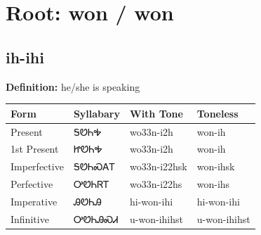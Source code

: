 \documentclass{article}%
\begin{document}
%
\normalsize%
\section*{Root: won / won}%
\subsection*{ih-ihi}%
\textbf{Definition: }%
he/she is speaking%
\\[0.5em]%
\begin{tabular}{|l|l|l|l|}%
\hline%
\textbf{Form}&\textbf{Syllabary}&\textbf{With Tone}&\textbf{Toneless}\\%
\hline%
Present&ᎦᏬᏂᎭ&wo33n{-}i2h&won{-}ih\\%
1st Present&ᏥᏬᏂᎭ&wo33n{-}i2h&won{-}ih\\%
Imperfective&ᎦᏬᏂᏍᎪᎢ&wo33n{-}i22hsk&won{-}ihsk\\%
Perfective&ᎤᏬᏂᏒᎢ&wo33n{-}i22hs&won{-}ihs\\%
Imperative&ᎯᏬᏂᎯ&hi{-}won{-}ihi&hi{-}won{-}ihi\\%
Infinitive&ᎤᏬᏂᎯᏍᏗ&u{-}won{-}ihihst&u{-}won{-}ihihst\\%
\hline%
\end{tabular}%
\\[1em]%
\end{document}
